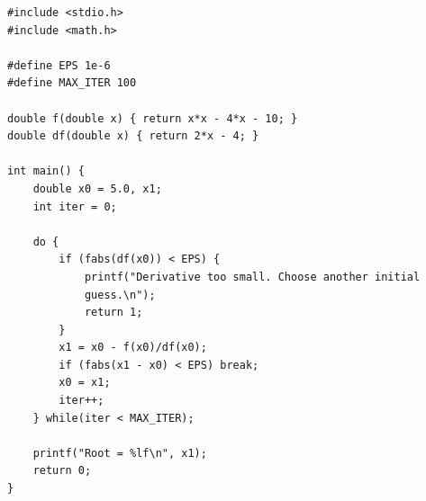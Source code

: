 \begin{verbatim}
#include <stdio.h>
#include <math.h>

#define EPS 1e-6
#define MAX_ITER 100

double f(double x) { return x*x - 4*x - 10; }
double df(double x) { return 2*x - 4; }

int main() {
    double x0 = 5.0, x1;
    int iter = 0;

    do {
        if (fabs(df(x0)) < EPS) {
            printf("Derivative too small. Choose another initial 
            guess.\n");
            return 1;
        }
        x1 = x0 - f(x0)/df(x0);
        if (fabs(x1 - x0) < EPS) break;
        x0 = x1;
        iter++;
    } while(iter < MAX_ITER);

    printf("Root = %lf\n", x1);
    return 0;
}


\end{verbatim}